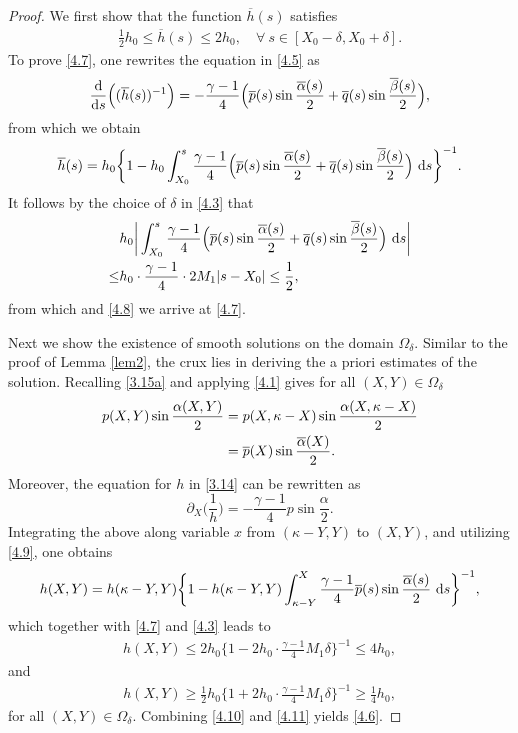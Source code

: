 \documentclass[11pt,reqno]{article}
\newcommand{\fr}{\frac}
\newcommand{\pa}{\partial}
\numberwithin{equation}{section}
\begin{document}
\begin{proof}
We first show that the function $\overline{h}(s)$ satisfies
\begin{align}\label{4.7}
\fr{1}{2}h_0\leq \overline{h}(s) \leq 2h_0,\quad \forall\ s\in[X_0-\delta, X_0+\delta].
\end{align}
To prove \eqref{4.7}, one rewrites the equation in \eqref{4.5} as
\begin{align}
\fr{{\rm d}}{{\rm d}s}\Big((\overline{h}(s))^{-1}\Big) =-\fr{\gamma-1}{4}\Big(\overline{p}(s)\sin\fr{\overline{\alpha}(s)}{2} +\overline{q}(s)\sin\fr{\overline{\beta}(s)}{2}\Big), \notag
\end{align}
from which we obtain
\begin{align}\label{4.8}
\overline{h}(s)=h_0\bigg\{1 -h_0\int_{X_0}^s\fr{\gamma-1}{4} \Big(\overline{p}(s)\sin\fr{\overline{\alpha}(s)}{2} +\overline{q}(s)\sin\fr{\overline{\beta}(s)}{2}\Big)\ {\rm d}s \bigg\}^{-1}.
\end{align}
It follows by the choice of $\delta$ in \eqref{4.3} that
\begin{align*}
&h_0\bigg|\int_{X_0}^s\fr{\gamma-1}{4} \Big(\overline{p}(s)\sin\fr{\overline{\alpha}(s)}{2} +\overline{q}(s)\sin\fr{\overline{\beta}(s)}{2}\Big)\ {\rm d}s\bigg| \\
\leq & h_0\cdot \fr{\gamma-1}{4} \cdot 2M_1|s-X_0|\leq \fr{1}{2},
\end{align*}
from which and \eqref{4.8} we arrive at \eqref{4.7}.

Next we show the existence of smooth solutions on the domain $\Omega_\delta$. Similar to the proof of Lemma \ref{lem2}, the crux lies in deriving the a priori estimates of the solution. Recalling \eqref{3.15a} and applying \eqref{4.1} gives for all $(X,Y)\in\Omega_\delta$
\begin{align}\label{4.9}
p(X,Y)\sin\fr{\alpha(X,Y)}{2}&=p(X,\kappa-X)\sin\fr{\alpha(X,\kappa-X)}{2} \notag \\
&=\overline{p}(X)\sin\fr{\overline{\alpha}(X)}{2}.
\end{align}
Moreover, the equation for $h$ in \eqref{3.14} can be rewritten as
$$
\pa_X\Big(\fr{1}{h}\Big)=-\fr{\gamma-1}{4}p\sin\fr{\alpha}{2}.
$$
Integrating the above along variable $x$ from $(\kappa-Y, Y)$ to $(X,Y)$, and utilizing \eqref{4.9}, one obtains
\begin{align*}
h(X,Y)=h(\kappa-Y,Y)\bigg\{1 -h(\kappa-Y,Y)\int_{\kappa-Y}^X\fr{\gamma-1}{4} \overline{p}(s)\sin\fr{\overline{\alpha}(s)}{2}\ {\rm d}s \bigg\}^{-1},
\end{align*}
which together with \eqref{4.7} and \eqref{4.3} leads to
\begin{align}\label{4.10}
h(X,Y)\leq 2h_0\bigg\{1 -2h_0\cdot \fr{\gamma-1}{4}M_1\delta \bigg\}^{-1}\leq 4h_0,
\end{align}
and
\begin{align}\label{4.11}
h(X,Y)\geq \fr{1}{2}h_0\bigg\{1 +2h_0\cdot \fr{\gamma-1}{4}M_1\delta \bigg\}^{-1}\geq \fr{1}{4}h_0,
\end{align}
for all $(X,Y)\in\Omega_\delta$. Combining \eqref{4.10} and \eqref{4.11} yields \eqref{4.6}.


\end{proof}
\end{document}
